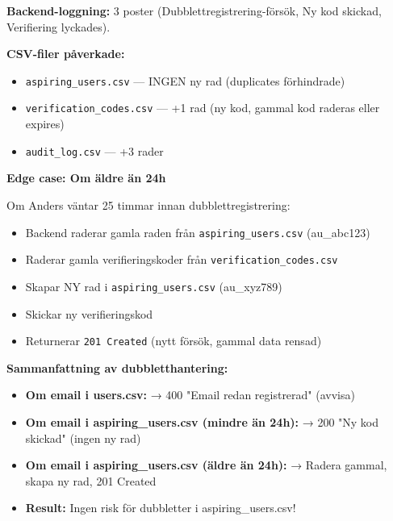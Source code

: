 \documentclass[12pt,a4paper]{article}
\begin{document}
\textbf{Backend-loggning:} 3 poster (Dubblettregistrering-försök, Ny kod skickad, Verifiering lyckades).

\textbf{CSV-filer påverkade:}
\begin{itemize}[noitemsep]
  \item \texttt{aspiring\_users.csv} — INGEN ny rad (duplicates förhindrade)
  \item \texttt{verification\_codes.csv} — +1 rad (ny kod, gammal kod raderas eller expires)
  \item \texttt{audit\_log.csv} — +3 rader
\end{itemize}

\textbf{Edge case: Om äldre än 24h}

Om Anders väntar 25 timmar innan dubblettregistrering:
\begin{itemize}[noitemsep]
  \item Backend raderar gamla raden från \texttt{aspiring\_users.csv} (au\_abc123)
  \item Raderar gamla verifieringskoder från \texttt{verification\_codes.csv}
  \item Skapar NY rad i \texttt{aspiring\_users.csv} (au\_xyz789)
  \item Skickar ny verifieringskod
  \item Returnerar \texttt{201 Created} (nytt försök, gammal data rensad)
\end{itemize}

\textbf{Sammanfattning av dubbletthantering:}
\begin{itemize}[noitemsep]
  \item \textbf{Om email i users.csv:} → 400 "Email redan registrerad" (avvisa)
  \item \textbf{Om email i aspiring\_users.csv (mindre än 24h):} → 200 "Ny kod skickad" (ingen ny rad)
  \item \textbf{Om email i aspiring\_users.csv (äldre än 24h):} → Radera gammal, skapa ny rad, 201 Created
  \item \textbf{Result:} Ingen risk för dubbletter i aspiring\_users.csv!
\end{itemize}
\end{document}
